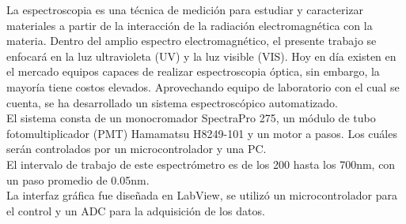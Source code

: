 \tableofcontents
\listoffigures
\listoftables
{}
La espectroscopia es una técnica de medición para estudiar y caracterizar materiales a partir de la interacción de la radiación electromagnética con la materia.
Dentro del amplio espectro electromagnético, el presente trabajo se enfocará en la luz ultravioleta (UV) y la luz visible (VIS). Hoy en día existen en el mercado equipos capaces de realizar espectroscopia óptica, sin embargo, la mayoría tiene costos elevados. Aprovechando equipo de laboratorio con el cual se cuenta, se ha desarrollado un sistema espectroscópico automatizado. \\
El sistema consta de un monocromador SpectraPro 275, un módulo de tubo fotomultiplicador (PMT) Hamamatsu H8249-101 y un motor a pasos. Los cuáles serán controlados por un microcontrolador y una PC.\\
El intervalo de trabajo de este espectrómetro es de los 200 hasta los 700nm, con un paso promedio de 0.05nm. \\
La interfaz gráfica fue diseñada en LabView, se utilizó un microcontrolador para el control y un ADC para la adquisición de los datos.
